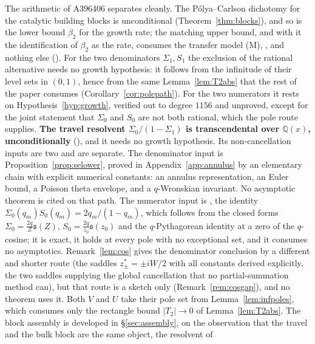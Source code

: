 \documentclass[11pt]{article}
\theoremstyle{plain}
\theoremstyle{definition}
\theoremstyle{remark}
\newcommand{\Q}{\mathbb{Q}}
\begin{document}
The arithmetic of A396406 separates cleanly. The P\'olya--Carlson dichotomy for the catalytic
building blocks is unconditional (Theorem~\ref{thm:blocks}), and so is the lower bound $\beta_2$
for the growth rate; the matching upper bound, and with it the identification of $\beta_2$ as the
rate, consumes the transfer model \textup{(M)}, {\cite[Theorem ``the transfer model \textup{(M)}'', \textup{thm:model}]{Bonfioli2026bA}}, and nothing else
({\cite[Corollary \textup{cor:beta}]{Bonfioli2026bA}}). For the two denominators $\Sigma_1,S_1$ the exclusion of the rational
alternative needs no growth hypothesis: it follows from the infinitude of their level sets in
$(0,1)$, hence from the same Lemma~\ref{lem:T2abs} that the rest of the paper consumes
(Corollary~\ref{cor:polepath}). For the two numerators it rests on Hypothesis~\ref{hyp:growth},
verified out to degree $1156$ and unproved, except for the joint statement that $\Sigma_0$ and
$S_0$ are not both rational, which the pole route supplies. \textbf{The travel resolvent
$\Sigma_0/(1-\Sigma_1)$ is transcendental over $\Q(x)$, unconditionally}
({\cite[Theorem ``the travel resolvent'', \textup{thm:travelres}]{Bonfioli2026bA}}), and it needs no growth hypothesis. Its non-cancellation inputs are
two and are separate. The denominator input is Proposition~\ref{prop:selower},
proved in Appendix~\ref{app:annulus} by an elementary chain with explicit numerical constants: an
annulus representation, an Euler bound, a Poisson theta envelope, and a $q$-Wronskian invariant. No
asymptotic theorem is cited on that path. The numerator input is
{\cite[Proposition ``the numerators do not vanish at the travel poles'', \textup{prop:numnonvanish}]{Bonfioli2026bA}}, the identity $\Sigma_0(q_m)S_0(q_m)=2q_m/(1-q_m)$, which
follows from the closed forms $\Sigma_0=\tfrac{2q}Z\mathfrak s(Z)$, $S_0=\tfrac{2q}{z_0}\mathfrak
s(z_0)$ and the $q$-Pythagorean identity at a zero of the $q$-cosine; it is exact, it holds at
every pole with no exceptional set, and it consumes no asymptotics. Remark~\ref{lem:cos} gives the
denominator conclusion by a
different and shorter route (the saddles $z^\ast_\pm=\pm iW/2$ with all constants derived
explicitly, the two saddles supplying the global cancellation that no partial-summation method can), but that route is a sketch only (Remark~\ref{rem:cosgap}), and no theorem uses it. Both $V$ and
$U$ take their pole set from Lemma~\ref{lem:infpoles}, which consumes only the rectangle bound
$|T_2|\to0$ of Lemma~\ref{lem:T2abs}. The block assembly is developed in \S\ref{sec:assembly}, on
the observation that the travel and the bulk block are the same object, the resolvent of
\end{document}
